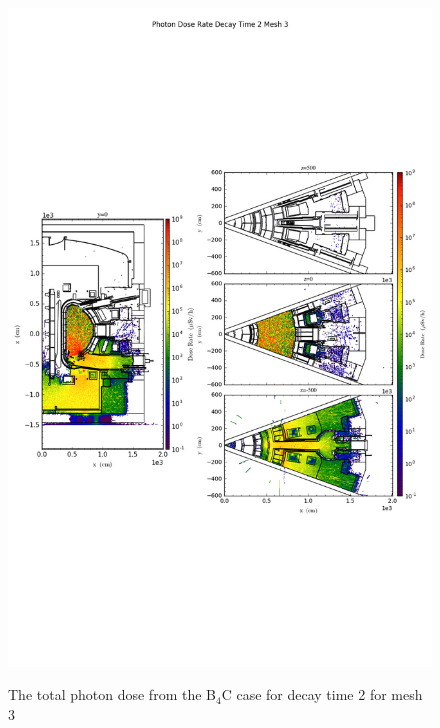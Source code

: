 \begin{figure}[ht!]
\centering
\includegraphics[trim={0cm 9cm 0cm 10cm},clip,scale=0.75]{../plots/final_model_with_b4c/Photon_Dose_Rate_Decay_Time_2_Mesh_3.png}
\label{fig:photons_dc2_no4bc_m3_flux}
\caption{The total photon dose from the B$_4$C case for decay time 2 for mesh 3}
\end{figure}
